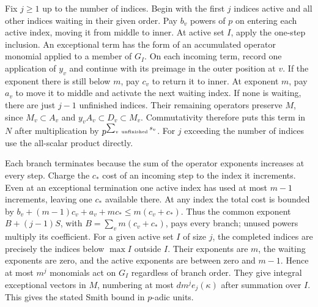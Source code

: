 \documentclass[11pt]{amsart}
\theoremstyle{definition}
\theoremstyle{remark}
\begin{document}
Fix $j\ge1$ up to the number of indices. Begin with the first $j$
indices active and all other indices waiting in their given order.
Pay $b_v$ powers of $p$ on entering each active index, moving it
from middle to inner. At active set $I$, apply the one-step
inclusion. An exceptional term has the form of an accumulated
operator monomial applied to a member of $G_I$. On each incoming
term, record one application of $y_v$ and continue with its
preimage in the outer position at $v$. If the exponent there is
still below $m$, pay $c_v$ to return it to inner. At exponent
$m$, pay $a_v$ to move it to middle and activate the next waiting
index. If none is waiting, there are just $j-1$ unfinished
indices. Their remaining operators preserve $M$, since
$M_v\subset A_v$ and $y_v A_v\subset D_v\subset M_v$.
Commutativity therefore puts this term in $N$ after multiplication
by $p^{\sum_{v\ {\rm unfinished}}s_v}$. For $j$ exceeding the
number of indices use the all-scalar product directly.

Each branch terminates because the sum of the operator exponents
increases at every step. Charge the $c_*$ cost of an incoming
step to the index it increments. Even at an exceptional termination
one active index has used at most $m-1$ increments, leaving one
$c_*$ available there. At any index the total cost is bounded by
$b_v+(m-1)c_v+a_v+mc_*\le m(c_v+c_*)$. Thus the common exponent
$B+(j-1)S$, with $B=\sum_v m(c_v+c_*)$, pays every branch;
unused powers multiply its coefficient. For a given active set
$I$ of size $j$, the completed indices are precisely the indices
below $\max I$ outside $I$. Their exponents are $m$, the waiting
exponents are zero, and the active exponents are between zero
and $m-1$. Hence at most $m^j$ monomials act on $G_I$ regardless
of branch order. They give integral exceptional vectors in $M$,
numbering at most $dm^j e_j(\kappa)$ after summation over $I$.
This gives the stated Smith bound in $p$-adic units.
\end{document}
